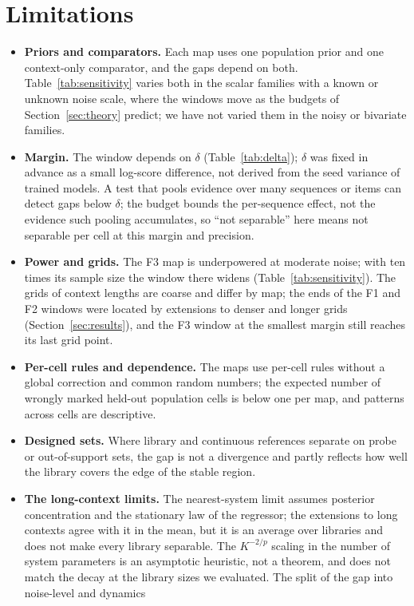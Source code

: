 \section{Limitations}\label{sec:limits}
\begin{itemize}
\item \textbf{Priors and comparators.} Each map uses one population prior and one context-only comparator, and the gaps
depend on both. Table~\ref{tab:sensitivity} varies both in the scalar families with a known or unknown noise scale, where the
windows move as the budgets of Section~\ref{sec:theory} predict; we have not varied them in the noisy or bivariate families.
\item \textbf{Margin.} The window depends on $\delta$ (Table~\ref{tab:delta}); $\delta$ was fixed in advance as a small
log-score difference, not derived from the seed variance of trained models. A test that pools evidence over many sequences
or items can detect gaps below $\delta$; the budget bounds the per-sequence effect, not the evidence such pooling
accumulates, so ``not separable'' here means not separable per cell at this margin and precision.
\item \textbf{Power and grids.} The F3 map is underpowered at moderate noise; with ten times its sample size the window there
widens (Table~\ref{tab:sensitivity}). The grids of context lengths are coarse and differ by map; the ends of the F1 and F2
windows were located by extensions to denser and longer grids (Section~\ref{sec:results}), and the F3 window at the smallest
margin still reaches its last grid point.
\item \textbf{Per-cell rules and dependence.} The maps use per-cell rules without a global correction and common random
numbers; the expected number of wrongly marked held-out population cells is below one per map, and patterns across cells are
descriptive.
\item \textbf{Designed sets.} Where library and continuous references separate on probe or out-of-support sets, the gap is
not a divergence and partly reflects how well the library covers the edge of the stable region.
\item \textbf{The long-context limits.} The nearest-system limit assumes posterior concentration and the stationary law of the
regressor; the extensions to long contexts agree with it in the mean, but it is an average over libraries and does not make
every library separable. The $K^{-2/p}$ scaling in the number of system parameters is an asymptotic heuristic, not a
theorem, and does not match the decay at the library sizes we evaluated. The split of the gap into noise-level and dynamics

\end{itemize}
